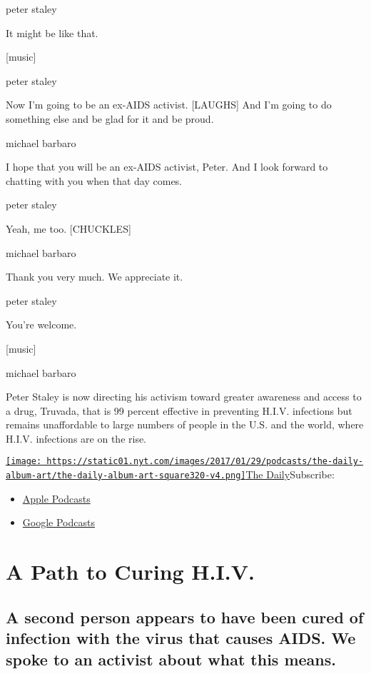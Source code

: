 peter staley

It might be like that.

{[}music{]}

peter staley

Now I'm going to be an ex-AIDS activist. {[}LAUGHS{]} And I'm going to
do something else and be glad for it and be proud.

michael barbaro

I hope that you will be an ex-AIDS activist, Peter. And I look forward
to chatting with you when that day comes.

peter staley

Yeah, me too. {[}CHUCKLES{]}

michael barbaro

Thank you very much. We appreciate it.

peter staley

You're welcome.

{[}music{]}

michael barbaro

Peter Staley is now directing his activism toward greater awareness and
access to a drug, Truvada, that is 99 percent effective in preventing
H.I.V. infections but remains unaffordable to large numbers of people in
the U.S. and the world, where H.I.V. infections are on the rise.

\href{https://www.nytimes.com/column/the-daily}{\texttt{[image: https://static01.nyt.com/images/2017/01/29/podcasts/the-daily-album-art/the-daily-album-art-square320-v4.png]}The
Daily}Subscribe:

\begin{itemize}
\tightlist
\item
  \href{https://itunes.apple.com/us/podcast/id1200361736}{Apple
  Podcasts}
\item
  \href{https://www.google.com/podcasts?feed=aHR0cHM6Ly9yc3MuYXJ0MTkuY29tL3RoZS1kYWlseQ\%3D\%3D}{Google
  Podcasts}
\end{itemize}

\hypertarget{a-path-to-curing-hiv-1}{%
\section{A Path to Curing H.I.V.}\label{a-path-to-curing-hiv-1}}

\hypertarget{a-second-person-appears-to-have-been-cured-of-infection-with-the-virus-that-causes-aids-we-spoke-to-an-activist-about-what-this-means-1}{%
\subsection{A second person appears to have been cured of infection with
the virus that causes AIDS. We spoke to an activist about what this
means.}\label{a-second-person-appears-to-have-been-cured-of-infection-with-the-virus-that-causes-aids-we-spoke-to-an-activist-about-what-this-means-1}}

